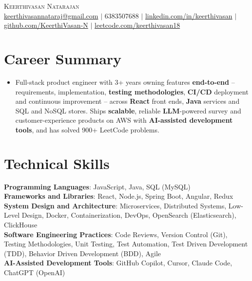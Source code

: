 \documentclass[letterpaper,11pt]{article}
\begin{document}
\begin{center}
    {\Huge \scshape Keerthivasan Natarajan} \\[0.5ex]
    \href{mailto:keerthivasannataraj@gmail.com}{keerthivasannataraj@gmail.com} $|$
    6383507688 $|$ 
    \href{https://linkedin.com/in/keerthi-vasan-83091321a}{linkedin.com/in/keerthivasan} $|$
    \href{https://github.com/KeerthiVasan-N}{github.com/KeerthiVasan-N} $|$
    \href{https://leetcode.com/u/Keerthivasan18/}{leetcode.com/keerthivasan18}
\end{center}

\section{Career Summary}
\begin{itemize}[leftmargin=0.15in, label={}]
  \item \small{Full-stack product engineer with 3+ years owning features \textbf{end-to-end} -- requirements, implementation, \textbf{testing methodologies}, \textbf{CI/CD} deployment and continuous improvement -- across \textbf{React} front ends, \textbf{Java} services and SQL and NoSQL stores. Ships \textbf{scalable}, reliable \textbf{LLM}-powered survey and customer-experience products on AWS with \textbf{AI-assisted development tools}, and has solved 900+ LeetCode problems.}
  
  
\end{itemize}

\section{Technical Skills}
\begin{itemize}[leftmargin=0.15in, label={}]
    \small{\item{
     \textbf{Programming Languages}{: JavaScript, Java, SQL (MySQL)} \\
     \textbf{Frameworks and Libraries}{: React, Node.js, Spring Boot, Angular, Redux} \\
  
     \textbf{System Design and Architecture}{: Microservices, Distributed Systems, Low-Level Design, Docker, Containerization, DevOps, OpenSearch (Elasticsearch), ClickHouse} \\
   
     \textbf{Software Engineering Practices}{: Code Reviews, Version Control (Git), Testing Methodologies, Unit Testing, Test Automation, Test Driven Development (TDD), Behavior Driven Development (BDD), Agile} \\
     \textbf{AI-Assisted Development Tools}{: GitHub Copilot, Cursor, Claude Code, ChatGPT (OpenAI)}
  
    }}
\end{itemize}
\end{document}
